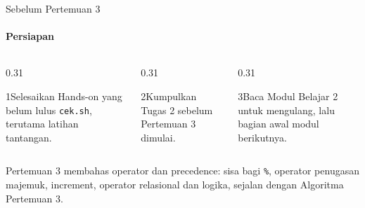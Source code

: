 \documentclass[t]{beamer}
\begin{document}
\begin{frame}{Sebelum Pertemuan 3}
\framesubtitle{Persiapan}
\begin{columns}[T]
\begin{column}{0.31\textwidth}
\begin{Langkah}{1}{Selesaikan}
Hands-on yang belum lulus \texttt{cek.sh}, terutama latihan tantangan.
\end{Langkah}
\end{column}
\begin{column}{0.31\textwidth}
\begin{Langkah}{2}{Kumpulkan}
Tugas 2 sebelum Pertemuan 3 dimulai.
\end{Langkah}
\end{column}
\begin{column}{0.31\textwidth}
\begin{Langkah}{3}{Baca}
Modul Belajar 2 untuk mengulang, lalu bagian awal modul berikutnya.
\end{Langkah}
\end{column}
\end{columns}
\vspace{10pt}
Pertemuan 3 membahas operator dan precedence: sisa bagi \texttt{\%}, operator penugasan majemuk, increment, operator relasional dan logika, sejalan dengan Algoritma Pertemuan 3.
\end{frame}

\end{document}
